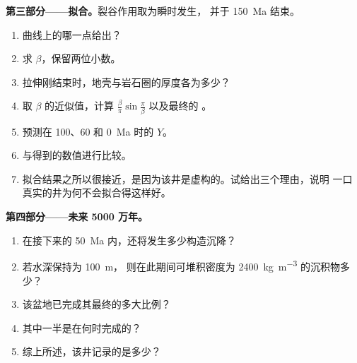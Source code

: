 \begin{problem}
\noindent\textbf{第三部分——拟合。}裂谷作用取为瞬时发生，
        并于 \qty{150}{Ma} 结束。
\begin{enumerate}[resume]
  \item 曲线上的哪一点给出？
  \item 求 $\beta$，保留两位小数。
  \item 拉伸刚结束时，地壳与岩石圈的厚度各为多少？
  \item 取 $\beta$ 的近似值，计算 $\frac{\beta}{\pi}\sin\frac{\pi}{\beta}$ 以及最终的
        。
  \item 预测在 100、60 和 \qty{0}{Ma} 时的 $Y$。
  \item 与得到的数值进行比较。
  \item 拟合结果之所以很接近，是因为该井是虚构的。试给出三个理由，说明
        一口真实的井为何不会拟合得这样好。
\end{enumerate}

\noindent\textbf{第四部分——未来 5000 万年。}
\begin{enumerate}[resume]
  \item 在接下来的 \qty{50}{Ma} 内，还将发生多少构造沉降？
  \item 若水深保持为 \qty{100}{m}，
        则在此期间可堆积密度为 \qty{2400}{kg.m^{-3}} 的沉积物多少？
  \item 该盆地已完成其最终的多大比例？
  \item 其中一半是在何时完成的？
  \item 综上所述，该井记录的是多少？
\end{enumerate}
\end{problem}
